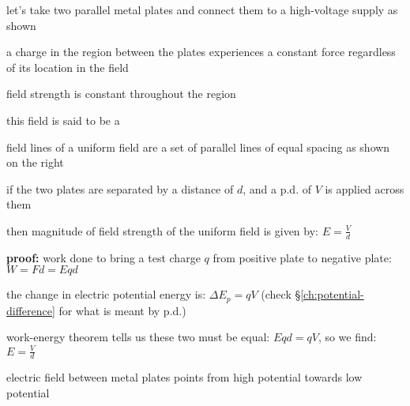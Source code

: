 let's take two parallel metal plates and connect them to a high-voltage supply as shown

a charge in the region between the plates experiences a constant force regardless of its location in the field

field strength is constant throughout the region

this field is said to be a 

field lines of a uniform field are a set of parallel lines of equal spacing as shown on the right



\cmt if the two plates are separated by a distance of $d$, and a p.d. of $V$ is applied across them

then magnitude of field strength of the uniform field is given by: $\boxed{ E = \frac{V}{d}}$

\noindent\textbf{proof:} work done to bring a test charge $q$ from positive plate to negative plate: $ W=Fd=Eqd $

the change in electric potential energy is: $ \Delta E_p = q V$ (check \S\ref{ch:potential-difference} for what is meant by p.d.)

work-energy theorem tells us these two must be equal: $ Eqd = qV$, so we find: $ {E=\frac{V}{d}} $


\cmt electric field between metal plates points from high potential towards low potential


